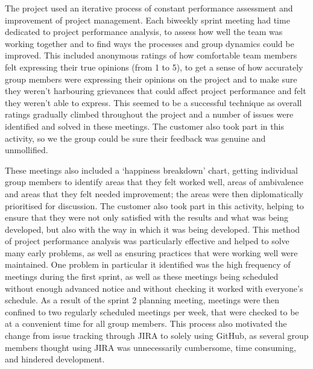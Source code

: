 \documentclass[a4paper, 12pt, twoside]{article}
\begin{document}
The project used an iterative process of constant performance assessment and improvement of project management. Each biweekly sprint meeting had time dedicated to project performance analysis, to assess how well the team was working together and to find ways the processes and group dynamics could be improved. This included anonymous ratings of how comfortable team members felt expressing their true opinions (from 1 to 5), to get a sense of how accurately group members were expressing their opinions on the project and to make sure they weren't harbouring grievances that could affect project performance and felt they weren't able to express. This seemed to be a successful technique as overall ratings gradually climbed throughout the project and a number of issues were identified and solved in these meetings. The customer also took part in this activity, so we the group could be sure their feedback was genuine and unmollified.

These meetings also included a `happiness breakdown' chart, getting individual group members to identify areas that they felt worked well, areas of ambivalence and areas that they felt needed improvement; the areas were then diplomatically prioritised for discussion. The customer also took part in this activity, helping to ensure that they were not only satisfied with the results and what was being developed, but also with the way in which it was being developed. This method of project performance analysis was particularly effective and helped to solve many early problems, as well as ensuring practices that were working well were maintained. One problem in particular it identified was the high frequency of meetings during the first sprint, as well as these meetings being scheduled without enough advanced notice and without checking it worked with everyone's schedule. As a result of the sprint 2 planning meeting, meetings were then confined to two regularly scheduled meetings per week, that were checked to be at a convenient time for all group members. This process also motivated the change from issue tracking through JIRA to solely using GitHub, as several group members thought using JIRA was unnecessarily cumbersome, time consuming, and hindered development.
\end{document}
